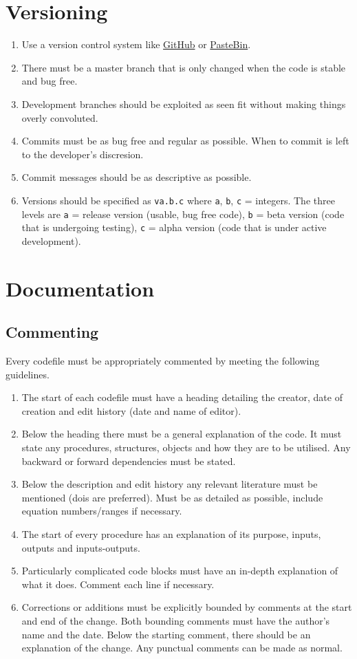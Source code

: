 \section{Versioning}\label{c:best_practices:s:versioning}
\begin{enumerate}
	\item Use a version control system like \href{https://github.com/}{GitHub} or \href{https://pastebin.com/}{PasteBin}.
	\item There must be a master branch that is only changed when the code is stable and bug free.
	\item Development branches should be exploited as seen fit without making things overly convoluted.
	\item Commits must be as bug free and regular as possible. When to commit is left to the developer's discresion.
	\item Commit messages should be as descriptive as possible.
	\item Versions should be specified as \texttt{va.b.c} where \texttt{a}, \texttt{b}, \texttt{c} = integers. The three levels are \texttt{a} = release version (usable, bug free code), \texttt{b} = beta version (code that is undergoing testing), \texttt{c} = alpha version (code that is under active development).
\end{enumerate}
%	 
\section{Documentation}\label{c:best_practices:s:documentation}
\subsection{Commenting}\label{c:best_practices:s:documentation:ss:commenting}
Every codefile must be appropriately commented by meeting the following guidelines.
\begin{enumerate}
	\item The start of each codefile must have a heading detailing the creator, date of creation and edit history (date and name of editor).
	\item Below the heading there must be a general explanation of the code. It must state any procedures, structures, objects and how they are to be utilised. Any backward or forward dependencies must be stated.
	\item Below the description and edit history any relevant literature must be mentioned (dois are preferred). Must be as detailed as possible, include equation numbers/ranges if necessary.
	\item The start of every procedure has an explanation of its purpose, inputs, outputs and inputs-outputs.
	\item Particularly complicated code blocks must have an in-depth explanation of what it does. Comment each line if necessary.
	\item Corrections or additions must be explicitly bounded by comments at the start and end of the change. Both bounding comments must have the author's name and the date. Below the starting comment, there should be an explanation of the change. Any punctual comments can be made as normal.
\end{enumerate}
